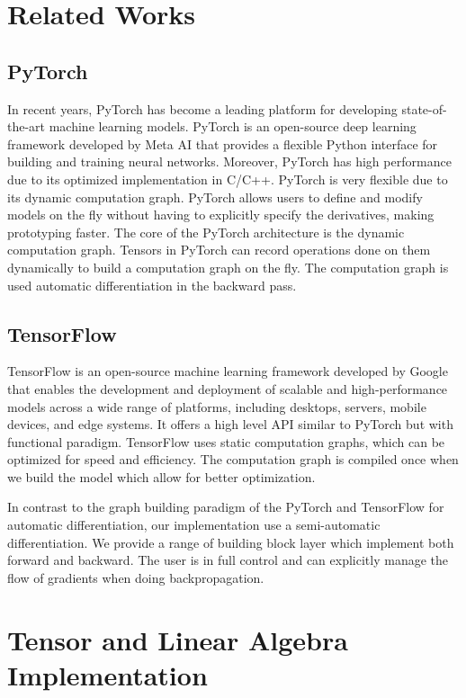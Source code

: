 \documentclass[conference]{IEEEtran}
\begin{document}
\section{Related Works}

\subsection{PyTorch}
In recent years, PyTorch has become a leading platform for developing state-of-the-art machine learning models. PyTorch is an open-source deep learning framework developed by Meta AI that provides a flexible Python interface for building and training neural networks. Moreover, PyTorch has high performance due to its optimized implementation in C/C++. PyTorch is very flexible due to its dynamic computation graph. PyTorch allows users to define and modify models on the fly without having to explicitly specify the derivatives, making prototyping faster. The core of the PyTorch architecture is the dynamic computation graph. Tensors in PyTorch can record operations done on them dynamically to build a computation graph on the fly. The computation graph is used automatic differentiation in the backward pass. 

\subsection{TensorFlow}
TensorFlow is an open-source machine learning framework developed by Google that enables the development and deployment of scalable and high-performance models across a wide range of platforms, including desktops, servers, mobile devices, and edge systems. It offers a high level API similar to PyTorch but with functional paradigm. TensorFlow uses static computation graphs, which can be optimized for speed and efficiency. The computation graph is compiled once when we build the model which allow for better optimization.

In contrast to the graph building paradigm of the PyTorch and TensorFlow for automatic differentiation, our implementation use a semi-automatic differentiation. We provide a range of building block layer which implement both forward and backward. The user is in full control and can explicitly manage the flow of gradients when doing backpropagation.

\section{Tensor and Linear Algebra Implementation}
\end{document}
